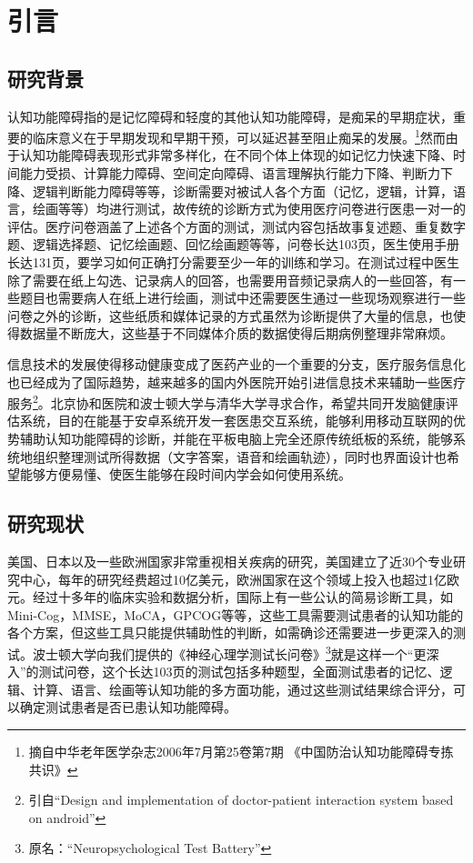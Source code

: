 

\chapter{引言}
\label{cha:intro}

\section{研究背景}

认知功能障碍指的是记忆障碍和轻度的其他认知功能障碍，是痴呆的早期症状，重要的临床意义在于早期发现和早期干预，可以延迟甚至阻止痴呆的发展。\footnote{摘自中华老年医学杂志2006年7月第25卷第7期 《中国防治认知功能障碍专拣共识》}然而由于认知功能障碍表现形式非常多样化，在不同个体上体现的如记忆力快速下降、时间能力受损、计算能力障碍、空间定向障碍、语言理解执行能力下降、判断力下降、逻辑判断能力障碍等等，诊断需要对被试人各个方面（记忆，逻辑，计算，语言，绘画等等）均进行测试，故传统的诊断方式为使用医疗问卷进行医患一对一的评估。医疗问卷涵盖了上述各个方面的测试，测试内容包括故事复述题、重复数字题、逻辑选择题、记忆绘画题、回忆绘画题等等，问卷长达103页，医生使用手册长达131页，要学习如何正确打分需要至少一年的训练和学习。在测试过程中医生除了需要在纸上勾选、记录病人的回答，也需要用音频记录病人的一些回答，有一些题目也需要病人在纸上进行绘画，测试中还需要医生通过一些现场观察进行一些问卷之外的诊断，这些纸质和媒体记录的方式虽然为诊断提供了大量的信息，也使得数据量不断庞大，这些基于不同媒体介质的数据使得后期病例整理非常麻烦。

信息技术的发展使得移动健康变成了医药产业的一个重要的分支，医疗服务信息化也已经成为了国际趋势，越来越多的国内外医院开始引进信息技术来辅助一些医疗服务\footnote{引自“Design and implementation of doctor-patient interaction system based on android”}。北京协和医院和波士顿大学与清华大学寻求合作，希望共同开发脑健康评估系统，目的在能基于安卓系统开发一套医患交互系统，能够利用移动互联网的优势辅助认知功能障碍的诊断，并能在平板电脑上完全还原传统纸板的系统，能够系统地组织整理测试所得数据（文字答案，语音和绘画轨迹），同时也界面设计也希望能够方便易懂、使医生能够在段时间内学会如何使用系统。

\section{研究现状}

美国、日本以及一些欧洲国家非常重视相关疾病的研究，美国建立了近30个专业研究中心，每年的研究经费超过10亿美元，欧洲国家在这个领域上投入也超过1亿欧元。经过十多年的临床实验和数据分析，国际上有一些公认的简易诊断工具，如Mini-Cog，MMSE，MoCA，GPCOG等等，这些工具需要测试患者的认知功能的各个方案，但这些工具只能提供辅助性的判断，如需确诊还需要进一步更深入的测试。波士顿大学向我们提供的《神经心理学测试长问卷》\footnote{原名：“Neuropsychological Test Battery”}就是这样一个“更深入”的测试问卷，这个长达103页的测试包括多种题型，全面测试患者的记忆、逻辑、计算、语言、绘画等认知功能的多方面功能，通过这些测试结果综合评分，可以确定测试患者是否已患认知功能障碍。

